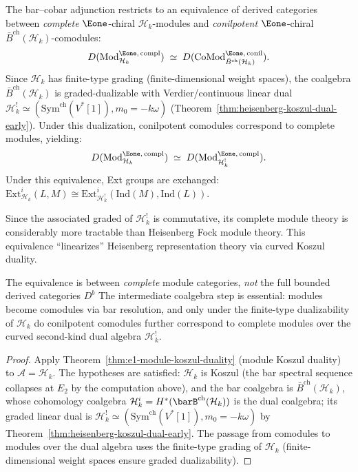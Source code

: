 \begin{corollary}
\label{cor:heisenberg-module-equivalence}
The bar--cobar adjunction restricts to an equivalence of derived categories
between \emph{complete} $\Eone$-chiral $\mathcal{H}_k$-modules and
\emph{conilpotent} $\Eone$-chiral $\bar{B}^{\mathrm{ch}}(\mathcal{H}_k)$-comodules:
\begin{equation}
D(\mathrm{Mod}^{\Eone,\,\mathrm{compl}}_{\mathcal{H}_k})
\;\simeq\;
D(\mathrm{CoMod}^{\Eone,\,\mathrm{conil}}_{\bar{B}^{\mathrm{ch}}(\mathcal{H}_k)}).
\end{equation}
Since $\mathcal{H}_k$ has finite-type grading (finite-dimensional weight spaces),
the coalgebra $\bar{B}^{\mathrm{ch}}(\mathcal{H}_k)$ is graded-dualizable with
Verdier/continuous linear dual
$\mathcal{H}_k^! \simeq
(\mathrm{Sym}^{\mathrm{ch}}(V^*[1]),m_0=-k\omega)$
(Theorem~\ref{thm:heisenberg-koszul-dual-early}). Under this dualization,
conilpotent comodules correspond to complete modules, yielding:
\begin{equation}
D(\mathrm{Mod}^{\Eone,\,\mathrm{compl}}_{\mathcal{H}_k})
\;\simeq\;
D(\mathrm{Mod}^{\Eone,\,\mathrm{compl}}_{\mathcal H_k^!}).
\end{equation}
Under this equivalence, Ext groups are exchanged:
$\mathrm{Ext}^i_{\mathcal{H}_k}(L, M) \cong
\mathrm{Ext}^i_{\mathcal H_k^!}(\mathrm{Ind}(M), \mathrm{Ind}(L))$.

Since the associated graded of $\mathcal H_k^!$ is commutative, its
complete module theory is considerably more tractable than Heisenberg
Fock module theory. This equivalence ``linearizes'' Heisenberg
representation theory via curved Koszul duality.
\end{corollary}

\begin{remark}
The equivalence is between \emph{complete} module categories,
\emph{not} the full bounded derived categories $D^b$
The intermediate
coalgebra step is essential: modules become comodules via bar resolution,
and only under the finite-type dualizability of $\mathcal{H}_k$
do conilpotent comodules further correspond to complete modules over the
curved second-kind dual algebra $\mathcal H_k^!$.
\end{remark}

\begin{proof}
Apply Theorem~\ref{thm:e1-module-koszul-duality} (module Koszul duality) to
$\mathcal{A} = \mathcal{H}_k$. The hypotheses are satisfied: $\mathcal{H}_k$
is Koszul (the bar spectral sequence collapses at $E_2$ by the computation above), and
the bar coalgebra is $\bar{B}^{\mathrm{ch}}(\mathcal{H}_k)$, whose
cohomology coalgebra $\mathcal{H}_k^i = H^*(\barB^{\mathrm{ch}}(\mathcal{H}_k))$
is the dual coalgebra; its graded linear dual is
$\mathcal{H}_k^! \simeq
(\mathrm{Sym}^{\mathrm{ch}}(V^*[1]),m_0=-k\omega)$ by
Theorem~\ref{thm:heisenberg-koszul-dual-early}. The passage from comodules to
modules over the dual algebra uses the finite-type grading of $\mathcal{H}_k$
(finite-dimensional weight spaces ensure graded dualizability).
\end{proof}

